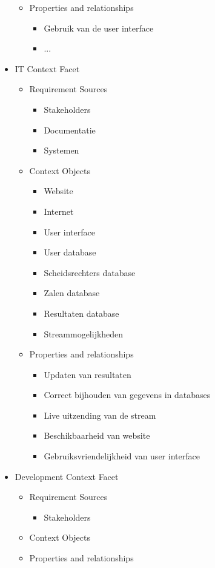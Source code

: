 \documentclass[12pt,a4paper]{article}
\begin{document}
\begin{itemize}
\begin{itemize}
				\item Properties and relationships
				\begin{itemize}
					\item Gebruik van de user interface
					\item ...
				\end{itemize}
			\end{itemize}
			\item IT Context Facet
			\begin{itemize}
				\item Requirement Sources
				\begin{itemize}
					\item Stakeholders
					\item Documentatie
					\item Systemen
				\end{itemize}
				\item Context Objects
				\begin{itemize}
					\item Website
					\item Internet
					\item User interface
					\item User database
					\item Scheidsrechters database
					\item Zalen database
					\item Resultaten database
					\item Streammogelijkheden
				\end{itemize}
				\item Properties and relationships
				\begin{itemize}
					\item Updaten van resultaten
					\item Correct bijhouden van gegevens in databases
					\item Live uitzending van de stream
					\item Beschikbaarheid van website
					\item Gebruiksvriendelijkheid van user interface
				\end{itemize}
			\end{itemize}
			\item Development Context Facet
			\begin{itemize}
				\item Requirement Sources
				\begin{itemize}
					\item Stakeholders
				\end{itemize}
				\item Context Objects
				\item Properties and relationships
			\end{itemize}
		\end{itemize}
		\newpage
\end{document}
